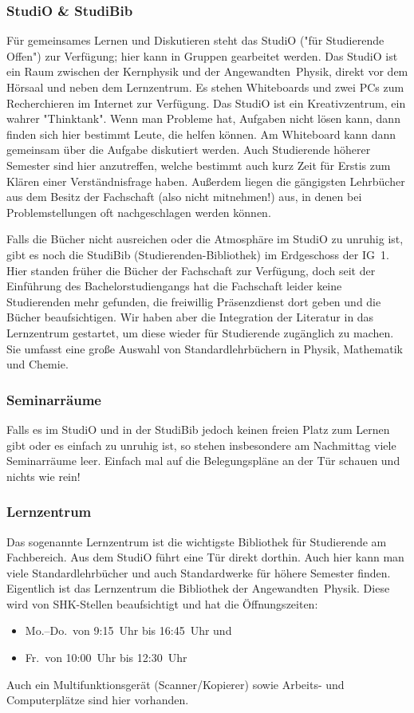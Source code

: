 \begin{multicols}{2}
\subsubsection*{StudiO \& StudiBib}
Für gemeinsames Lernen und Diskutieren steht das StudiO ("für Studierende Offen") zur Verfügung; hier kann in Gruppen gearbeitet werden. Das StudiO ist ein Raum zwischen der Kernphysik und der Angewandten~Physik, direkt vor dem Hörsaal und neben dem Lernzentrum. Es stehen Whiteboards und zwei PCs zum Recherchieren im Internet zur Verfügung. Das StudiO ist ein Kreativzentrum, ein wahrer "Thinktank". Wenn man Probleme hat, Aufgaben nicht lösen kann, dann finden sich hier bestimmt Leute, die helfen können. Am Whiteboard kann dann gemeinsam über die Aufgabe diskutiert werden. Auch Studierende höherer Semester sind hier anzutreffen, welche bestimmt auch kurz Zeit für Erstis zum Klären einer Verständnisfrage haben. Außerdem liegen die gängigsten Lehrbücher aus dem Besitz der Fachschaft (also nicht mitnehmen!) aus, in denen bei Problemstellungen oft nachgeschlagen werden können.

Falls die Bücher nicht ausreichen oder die Atmosphäre im StudiO zu unruhig ist, gibt es noch die StudiBib (Studierenden-Bibliothek) im Erdgeschoss der IG~1. Hier standen früher die Bücher der Fachschaft zur Verfügung, doch seit der Einführung des Bachelorstudiengangs hat die Fachschaft leider keine Studierenden mehr gefunden, die freiwillig Präsenzdienst dort geben und die Bücher beaufsichtigen. Wir haben aber die Integration der Literatur in das Lernzentrum gestartet, um diese wieder für Studierende zugänglich zu machen. Sie umfasst eine große Auswahl von Standardlehrbüchern in Physik, Mathematik und Chemie.

\subsubsection*{Seminarräume}
Falls es im StudiO und in der StudiBib jedoch keinen freien Platz zum Lernen gibt oder es einfach zu unruhig ist, so stehen insbesondere am Nachmittag viele Seminarräume leer. Einfach mal auf die Belegungspläne an der Tür schauen und nichts wie rein!

\subsubsection*{Lernzentrum}
Das sogenannte Lernzentrum ist die wichtigste Bibliothek für Studierende am Fachbereich. Aus dem StudiO führt eine Tür direkt dorthin. Auch hier kann man viele Standardlehrbücher und auch Standardwerke für höhere Semester finden. Eigentlich ist das Lernzentrum die Bibliothek der Angewandten~Physik. Diese wird von SHK-Stellen beaufsichtigt und hat die Öffnungszeiten:
\begin{itemize}
\item Mo.--Do.\ von 9:15~Uhr bis 16:45~Uhr und
\item Fr.\ von 10:00~Uhr bis 12:30~Uhr
\end{itemize}
Auch ein Multifunktionsgerät (Scanner/Kopierer) sowie Arbeits- und Computerplätze sind hier vorhanden.


\end{multicols}
